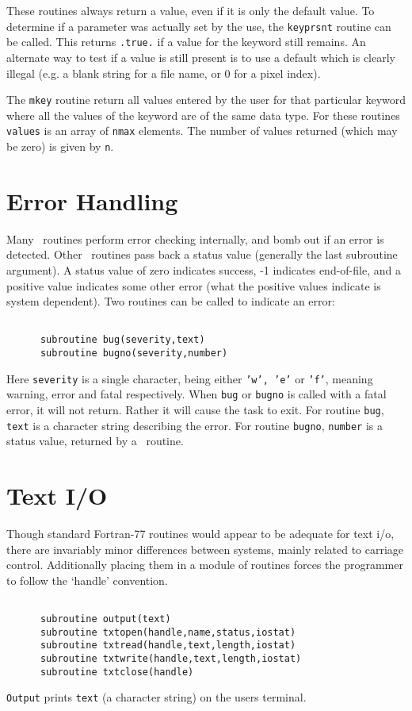 These routines always return a value, even if it is only the default
value. To determine if a parameter was actually set by the use, the
{\tt keyprsnt} routine can be called. This returns {\tt .true.} if a value for
the keyword still remains. An alternate way to test if a value is still
present is to use a default which is 
clearly illegal (e.g. a blank string for a file name, or 0 for a
pixel index).

The {\tt mkey} routine return all values entered by the user for that
particular keyword where all the values of the keyword are of the same
data type. For these routines {\tt values} is an array of {\tt nmax}
elements. The number of values returned (which may be zero) is given
by {\tt n}.

\section{Error Handling}
Many \miriad\ routines perform error checking internally, and bomb out if an
error is detected. Other \miriad\ routines pass back a status value (generally
the last subroutine argument). A status value of zero indicates success,
-1 indicates end-of-file, and a positive value indicates some other error
(what the positive values indicate is system dependent). Two routines can
be called to indicate an error:
\begin{verbatim}

      subroutine bug(severity,text)
      subroutine bugno(severity,number)

\end{verbatim}
Here {\tt severity} is a single character, being either {\tt 'w', 'e'} or
{\tt 'f'}, meaning warning, error and fatal respectively. When {\tt bug}
or {\tt bugno}
is called with a fatal error, it will not return. Rather it will
cause the task to exit. For routine {\tt bug}, {\tt text} is a character
string describing the error. For routine {\tt bugno}, {\tt number} is a
status value, returned by a \miriad\ routine.

\section{Text I/O}
Though standard Fortran-77 routines would appear to be adequate for text i/o,
there are invariably minor differences between systems, mainly related to
carriage control. Additionally placing them in a module of routines forces
the programmer to follow the `handle' convention.
\begin{verbatim}

      subroutine output(text)
      subroutine txtopen(handle,name,status,iostat)
      subroutine txtread(handle,text,length,iostat)
      subroutine txtwrite(handle,text,length,iostat)
      subroutine txtclose(handle)

\end{verbatim}
{\tt Output} prints {\tt text} (a character string) on the users terminal.


